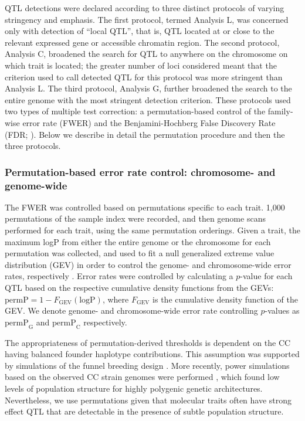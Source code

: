 \documentclass[10pt,letterpaper]{article}
\newcommand{\permpc}{\text{permP}_{\text{C}}}
\newcommand{\permpg}{\text{permP}_{\text{G}}}
\begin{document}
QTL detections were declared according to three distinct protocols of varying stringency and emphasis. The first protocol, termed Analysis L, was concerned only with detection of ``local QTL'', that is, QTL located at or close to the relevant expressed gene or accessible chromatin region.
The second protocol, Analysis C, broadened the search for QTL to anywhere on the chromosome on which trait is located; the greater number of loci considered meant that the criterion used to call detected QTL for this protocol was more stringent than Analysis L.
The third protocol, Analysis G, further broadened the search to the entire genome with the most stringent detection criterion.
These protocols used two types of multiple test correction: a permutation-based control of the family-wise error rate (FWER) and the Benjamini-Hochberg False Discovery Rate (FDR; \cite{Benjamini1995}). Below we describe in detail the permutation procedure and then the three protocols.

\subsubsection*{Permutation-based error rate control: chromosome- and genome-wide}

The FWER was controlled based on permutations specific to each trait. 1,000 permutations of the sample index were recorded, and then genome scans performed for each trait, using the same permutation orderings. Given a trait, the maximum logP from either the entire genome or the chromosome for each permutation was collected, and used to fit a null generalized extreme value distribution (GEV) in order to control the genome- and chromosome-wide error rates, respectively \cite{Dudbridge2004}. 
Error rates were controlled by calculating a $p$-value for each QTL based on the respective cumulative density functions from the GEVs: $\text{permP} = 1 - F_{\text{GEV}}(\text{logP})$, where $F_{\text{GEV}}$ is the cumulative density function of the GEV. We denote genome- and chromosome-wide error rate controlling  $p$-values as $\permpg$ and $\permpc$ respectively.

The appropriateness of permutation-derived thresholds \cite{Doerge1996} is dependent on the CC having balanced founder haplotype contributions. This assumption was supported by simulations of the funnel breeding design \cite{Valdar2006c}. More recently, power simulations based on the observed CC strain genomes were performed \cite{Keele2019}, which found low levels of population structure for highly polygenic genetic architectures. Nevertheless, we use permutations given that molecular traits often have strong effect QTL that are detectable in the presence of subtle population structure.
\end{document}

